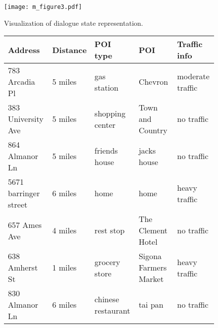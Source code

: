 \documentclass[11pt]{article}
\begin{document}
\begin{figure}[!tp]
\centering
\texttt{[image: m\_figure3.pdf]}
\caption{Visualization of dialogue state representation.}
\end{figure}
\begin{figure}[!t]
	\centering
	\normalsize
	\label{fig4}
	\begin{tabular}{|l|l|l|l|l|}
		\hline\textbf{Address} & \textbf{Distance} & \textbf{POI type} & \textbf{POI} & \textbf{Traffic info} \\\hline
		783 Arcadia Pl&5 miles&gas station&Chevron&moderate traffic\\
		383 University Ave&5 miles&shopping center&Town and Country&no traffic\\
		864 Almanor Ln & 5 miles &friends house& jacks house & no traffic \\
		5671 barringer street&6 miles&home&home&heavy traffic\\
		657 Ames Ave&4 miles&rest stop&The Clement Hotel&no traffic\\
		638 Amherst St&1 miles&grocery store&Sigona Farmers Market&heavy traffic\\
		830 Almanor Ln&6 miles&chinese restaurant&tai pan&no traffic\\\hline
	\end{tabular}
	\\
	
	\begin{minipage}{0.49 \textwidth}
		\raggedright
		

\end{minipage}
\end{figure}
\end{document}
